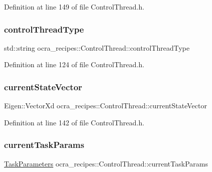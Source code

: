 Definition at line 149 of file Control\+Thread.\+h.

\hypertarget{classocra__recipes_1_1ControlThread_aa8c8f3c06e3e2f22a0d46814f067ec79}{}\label{classocra__recipes_1_1ControlThread_aa8c8f3c06e3e2f22a0d46814f067ec79} 
\subsubsection{\texorpdfstring{control\+Thread\+Type}{controlThreadType}}
{\footnotesize\ttfamily std\+::string ocra\+\_\+recipes\+::\+Control\+Thread\+::control\+Thread\+Type\hspace{0.3cm}{\ttfamily [protected]}}



Definition at line 124 of file Control\+Thread.\+h.

\hypertarget{classocra__recipes_1_1ControlThread_afa7f90785f2768cc74b5043044d09912}{}\label{classocra__recipes_1_1ControlThread_afa7f90785f2768cc74b5043044d09912} 
\subsubsection{\texorpdfstring{current\+State\+Vector}{currentStateVector}}
{\footnotesize\ttfamily Eigen\+::\+Vector\+Xd ocra\+\_\+recipes\+::\+Control\+Thread\+::current\+State\+Vector\hspace{0.3cm}{\ttfamily [protected]}}



Definition at line 142 of file Control\+Thread.\+h.

\hypertarget{classocra__recipes_1_1ControlThread_ad2f5b157570bbcb6298d667cc264fc26}{}\label{classocra__recipes_1_1ControlThread_ad2f5b157570bbcb6298d667cc264fc26} 
\subsubsection{\texorpdfstring{current\+Task\+Params}{currentTaskParams}}
{\footnotesize\ttfamily \hyperlink{classocra__recipes_1_1TaskParameters}{Task\+Parameters} ocra\+\_\+recipes\+::\+Control\+Thread\+::current\+Task\+Params\hspace{0.3cm}{\ttfamily [protected]}}



